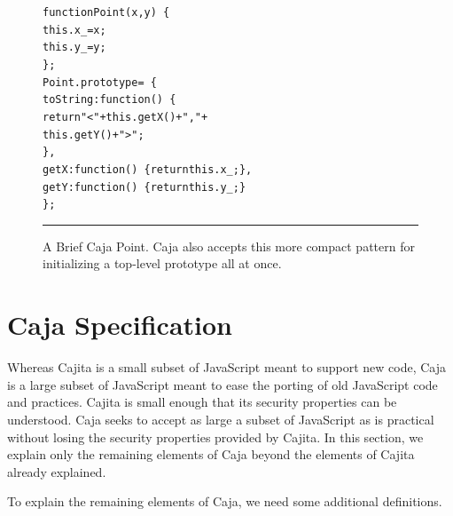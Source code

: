 \documentclass[letterpaper,twocolumn,10pt]{article}
\begin{document}
\begin{figure}[t!]
\begin{alltt}
function Point(x, y)\ \{
  this.x\_ = x;
  this.y\_ = y;
\};
Point.prototype =\ \{
  toString: function()\ \{ 
    return "<" + this.getX() + "," + 
                 this.getY() + ">"; 
  \},
  getX: function()\ \{ return this.x\_; \},
  getY: function()\ \{ return this.y\_; \}
\};
\end{alltt}

\caption[A Brief Caja Point.]{A Brief Caja Point. Caja also accepts this more
compact pattern for initializing a top-level prototype all at once.
\\ } \hrule
\label{fig:brief-caja-point}
\end{figure}


\section{Caja Specification}
\label{sec:caja-spec}

Whereas Cajita is a small subset of JavaScript meant to support new code, 
Caja is a large subset of JavaScript meant to ease the porting of old 
JavaScript code and practices. Cajita is small enough that its security 
properties can be understood. Caja seeks to accept as large a subset of 
JavaScript as is practical without losing the security properties provided by 
Cajita. In this section, we explain only the remaining elements of Caja 
beyond the elements of Cajita already explained.

To explain the remaining elements of Caja, we need some additional 
definitions.
\end{document}
